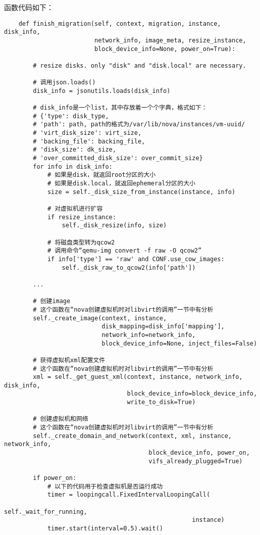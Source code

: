 \documentclass[a4paper,left=1.5cm,right=1.5cm,11pt]{article}
\begin{document}
	函数代码如下：
	\begin{lstlisting}
	def finish_migration(self, context, migration, instance, disk_info,
                         network_info, image_meta, resize_instance,
                         block_device_info=None, power_on=True):

        # resize disks. only "disk" and "disk.local" are necessary.

		# 调用json.loads()
        disk_info = jsonutils.loads(disk_info)

		# disk_info是一个list，其中存放着一个个字典，格式如下：
		# {'type': disk_type,
		# 'path': path, path的格式为/var/lib/nova/instances/vm-uuid/
		# 'virt_disk_size': virt_size,
		# 'backing_file': backing_file,
		# 'disk_size': dk_size,
		# 'over_committed_disk_size': over_commit_size}
        for info in disk_info:
			# 如果是disk，就返回root分区的大小
			# 如果是disk.local，就返回ephemeral分区的大小
            size = self._disk_size_from_instance(instance, info)

			# 对虚拟机进行扩容
            if resize_instance:
                self._disk_resize(info, size)
			
			# 将磁盘类型转为qcow2
			# 调用命令“qemu-img convert -f raw -O qcow2”
            if info['type'] == 'raw' and CONF.use_cow_images:
                self._disk_raw_to_qcow2(info['path'])

		...

        # 创建image
		# 这个函数在“nova创建虚拟机时对libvirt的调用”一节中有分析
        self._create_image(context, instance,
                           disk_mapping=disk_info['mapping'],
                           network_info=network_info,
                           block_device_info=None, inject_files=False)
		
		# 获得虚拟机xml配置文件
		# 这个函数在“nova创建虚拟机时对libvirt的调用”一节中有分析
        xml = self._get_guest_xml(context, instance, network_info, disk_info,
                                  block_device_info=block_device_info,
                                  write_to_disk=True)
		
		# 创建虚拟机和网络
		# 这个函数在“nova创建虚拟机时对libvirt的调用”一节中有分析
        self._create_domain_and_network(context, xml, instance, network_info,
                                        block_device_info, power_on,
                                        vifs_already_plugged=True)
		
        if power_on:
			# 以下的代码用于检查虚拟机是否运行成功
            timer = loopingcall.FixedIntervalLoopingCall(
                                                    self._wait_for_running,
                                                    instance)
            timer.start(interval=0.5).wait()
	\end{lstlisting}
\end{document}
